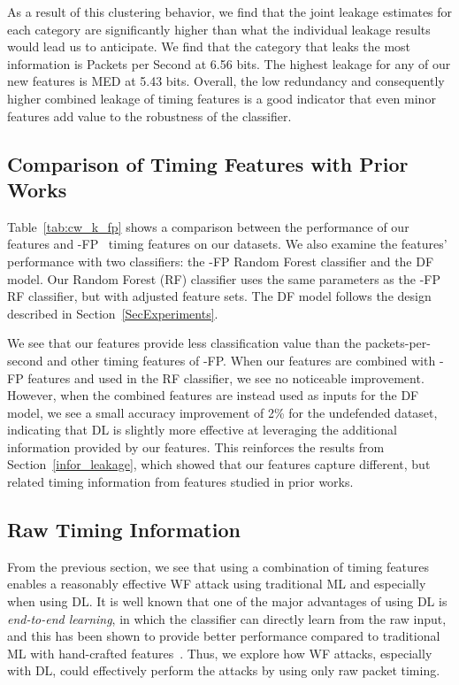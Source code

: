 \documentclass[USenglish,oneside,twocolumn]{article}
\begin{document}
 
As a result of this clustering behavior, we find that the joint leakage estimates for each category are significantly higher than what the individual leakage results would lead us to anticipate. We find that the category that leaks the most information is Packets per Second at 6.56 bits. The highest leakage for any of our new features is MED at 5.43 bits. Overall, the low redundancy and consequently higher combined leakage of timing features is a good indicator that even minor features add value to the robustness of the classifier.



\subsection{Comparison of Timing Features with Prior Works}
\label{k_fp_feats_our_feats_compare}
Table~\ref{tab:cw_k_fp} shows a comparison between the performance of our features and -FP~\cite{hayes2016k} timing features on our datasets. We also examine the features' performance with two classifiers: the -FP Random Forest classifier and the DF model. Our Random Forest (RF) classifier uses the same parameters as the -FP RF classifier, but with adjusted feature sets. The DF model follows the design described in Section~\ref{SecExperiments}.

We see that our features provide less classification value than the packets-per-second and other timing features of -FP. 
When our features are combined with -FP features and used in the RF classifier, we see no noticeable improvement. However, when the combined features are instead used as inputs for the DF model, we see a small accuracy improvement of 2\% for the undefended dataset, indicating that DL is slightly more effective at leveraging the additional information provided by our features. This reinforces the results from Section~\ref{infor_leakage}, which showed that our features capture different, but related timing information from features studied in prior works.




\subsection{Raw Timing Information}
\label{rawtimingexps}


From the previous section, we see that using a combination of timing features enables  a reasonably effective WF attack using traditional ML and especially when using DL. It is well known that one of the major advantages of using DL is \textit{end-to-end learning}, in which the classifier can directly learn from the raw input, and this has been shown to provide better performance compared to traditional ML with hand-crafted features~\cite{Song2015end}. Thus, we explore how WF attacks, especially with DL, could effectively perform the attacks by using only raw packet timing. 
\end{document}
